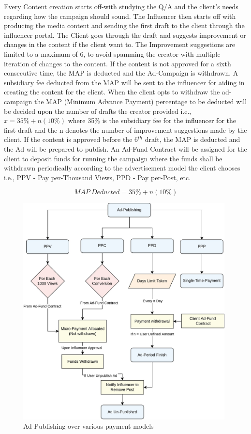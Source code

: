 \documentclass[letterpaper,11pt]{article}
\begin{document}
Every Content creation starts off-with studying the Q/A and the client's needs regarding how the campaign should sound. The Influencer then starts off with producing the media content and sending the first draft to the client through the influencer portal. The Client goes through the draft and suggests improvement or changes in the content if the client want to. The Improvement suggestions are limited to a maximum of 6, to avoid spamming the creator with multiple iteration of changes to the content. If the content is not approved for a sixth consecutive time, the MAP is deducted and the Ad-Campaign is withdrawn. A subsidiary fee deducted from the MAP will be sent to the influencer for aiding in creating the content for the client. When the client opts to withdraw the ad-campaign the MAP (Minimum Advance Payment) percentage to be deducted will be decided upon the number of drafts the creator provided i.e., $x=35\%+n(10\%)$ where 35\% is the subsidiary fee for the influencer for the first draft and the n denotes the number of improvement suggestions made by the client. If the content is approved before the 6$^{th}$ draft, the MAP is deducted and the Ad will be prepared to publish. An Ad-Fund Contract will be assigned for the client to deposit funds for running the campaign where the funds shall be withdrawn periodically according to the advertisement model the client chooses i.e., PPV - Pay per-Thousand Views, PPD - Pay per-Post, etc.

\begin{equation}
MAP\:Deducted=35\%+n(10\%)
\end{equation}

\begin{figure}
\begin{center}
\includegraphics[width=11cm]{ad-publish}
\caption{Ad-Publishing over various payment models}
\end{center}
\end{figure}
\end{document}
